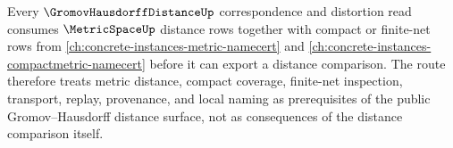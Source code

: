 Every $\GromovHausdorffDistanceUp$ correspondence and distortion read consumes $\MetricSpaceUp$ distance rows together with compact or finite-net rows from \autoref{ch:concrete-instances-metric-namecert} and \autoref{ch:concrete-instances-compactmetric-namecert} before it can export a distance comparison. The route therefore treats metric distance, compact coverage, finite-net inspection, transport, replay, provenance, and local naming as prerequisites of the public Gromov--Hausdorff distance surface, not as consequences of the distance comparison itself.
